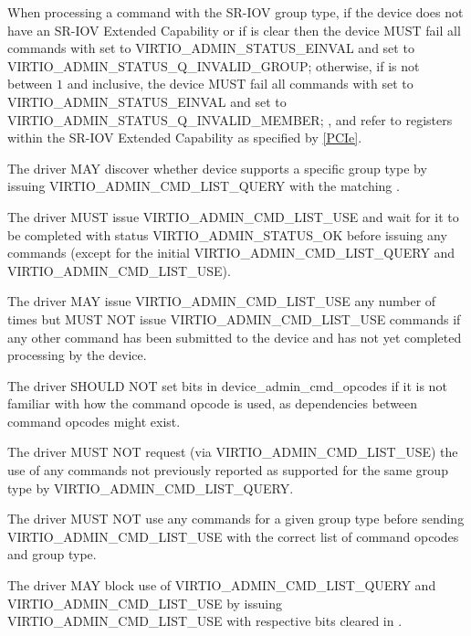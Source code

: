 When processing a command with the SR-IOV group type,
if the device does not have an SR-IOV Extended Capability or
if  is clear
then the device MUST fail all commands with
 set to VIRTIO_ADMIN_STATUS_EINVAL and
 set to
VIRTIO_ADMIN_STATUS_Q_INVALID_GROUP;
otherwise, if  is not
between $1$ and  inclusive,
the device MUST fail all commands with
 set to VIRTIO_ADMIN_STATUS_EINVAL and
 set to
VIRTIO_ADMIN_STATUS_Q_INVALID_MEMBER;
,   and
 refer to registers within the SR-IOV Extended
Capability as specified by \hyperref[intro:PCIe]{[PCIe]}.


The driver MAY discover whether device supports a specific group type
by issuing VIRTIO_ADMIN_CMD_LIST_QUERY with the matching
.

The driver MUST issue VIRTIO_ADMIN_CMD_LIST_USE
and wait for it to be completed with status
VIRTIO_ADMIN_STATUS_OK before issuing any commands
(except for the initial VIRTIO_ADMIN_CMD_LIST_QUERY
and VIRTIO_ADMIN_CMD_LIST_USE).

The driver MAY issue VIRTIO_ADMIN_CMD_LIST_USE any number
of times but MUST NOT issue VIRTIO_ADMIN_CMD_LIST_USE commands
if any other command has been submitted to the
device and has not yet completed processing by the device.

The driver SHOULD NOT set bits in device_admin_cmd_opcodes
if it is not familiar with how the command opcode
is used, as dependencies between command opcodes might exist.

The driver MUST NOT request (via VIRTIO_ADMIN_CMD_LIST_USE)
the use of any commands not previously reported as
supported for the same group type by VIRTIO_ADMIN_CMD_LIST_QUERY.

The driver MUST NOT use any commands for a given group type
before sending VIRTIO_ADMIN_CMD_LIST_USE with the correct
list of command opcodes and group type.

The driver MAY block use of VIRTIO_ADMIN_CMD_LIST_QUERY and
VIRTIO_ADMIN_CMD_LIST_USE by issuing VIRTIO_ADMIN_CMD_LIST_USE
with respective bits cleared in .

